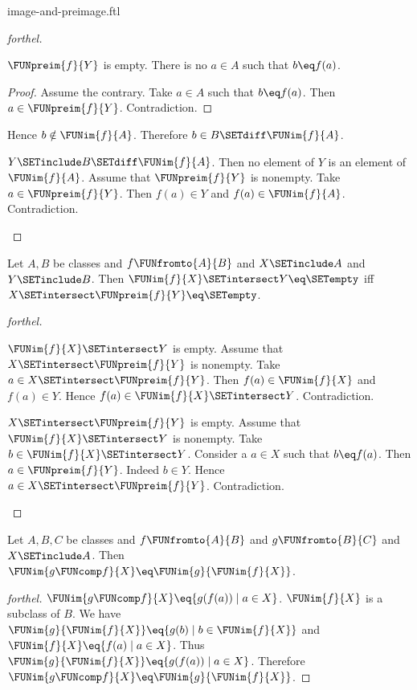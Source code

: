 \documentclass{naproche-library}
\begin{document}
\begin{smodule}[title=Computation Laws for Images and Preimages]{image-and-preimage.ftl}
\begin{proof}[forthel]
\begin{case}{$\FUNpreim{f}{Y}$ is empty.}
    There is no $a \in A$ such that $b \eq f(a)$.
    \begin{proof}
      Assume the contrary.
      Take $a \in A$ such that $b \eq f(a)$.
      Then $a \in \FUNpreim{f}{Y}$.
      Contradiction.
    \end{proof}

    Hence $b \notin \FUNim{f}{A}$.
    Therefore $b \in B \SETdiff \FUNim{f}{A}$.
  \end{case}

  \begin{case}{$Y \SETinclude B \SETdiff \FUNim{f}{A}$.}
    Then no element of $Y$ is an element of $\FUNim{f}{A}$.
    Assume that $\FUNpreim{f}{Y}$ is nonempty.
    Take $a \in \FUNpreim{f}{Y}$.
    Then $f(a) \in Y$ and $f(a) \in \FUNim{f}{A}$.
    Contradiction.
  \end{case}
\end{proof}

\begin{proposition}[forthel,id=FOUNDATIONS_07_6295504988143616]
  Let $A, B$ be classes and $f \FUNfromto{A}{B}$ and $X \SETinclude A$ and $Y \SETinclude B$.
  Then $\FUNim{f}{X} \SETintersect Y \eq \SETempty$ iff $X \SETintersect \FUNpreim{f}{Y} \eq \SETempty$.
\end{proposition}
\begin{proof}[forthel]
  \begin{case}{$\FUNim{f}{X} \SETintersect Y$ is empty.}
    Assume that $X \SETintersect \FUNpreim{f}{Y}$ is nonempty.
    Take $a \in X \SETintersect \FUNpreim{f}{Y}$.
    Then $f(a) \in \FUNim{f}{X}$ and $f(a) \in Y$.
    Hence $f(a) \in \FUNim{f}{X} \SETintersect Y$.
    Contradiction.
  \end{case}

  \begin{case}{$X \SETintersect \FUNpreim{f}{Y}$ is empty.}
    Assume that $\FUNim{f}{X} \SETintersect Y$ is nonempty.
    Take $b \in \FUNim{f}{X} \SETintersect Y$.
    Consider a $a \in X$ such that $b \eq f(a)$.
    Then $a \in \FUNpreim{f}{Y}$.
    Indeed $b \in Y$.
    Hence $a \in X \SETintersect \FUNpreim{f}{Y}$.
    Contradiction.
  \end{case}
\end{proof}

\begin{proposition}[forthel,id=FOUNDATIONS_07_5628919411638272]
  Let $A, B, C$ be classes and $f \FUNfromto{A}{B}$ and $g \FUNfromto{B}{C}$ and $X \SETinclude A$.
  Then $\FUNim{g \FUNcomp f}{X} \eq \FUNim{g}{\FUNim{f}{X}}$.
\end{proposition}
\begin{proof}[forthel]
  $\FUNim{g \FUNcomp f}{X} \eq \{ g(f(a)) \mid a \in X \}$.
  $\FUNim{f}{X}$ is a subclass of $B$.
  We have $\FUNim{g}{\FUNim{f}{X}} \eq \{ g(b) \mid b \in \FUNim{f}{X} \}$ and $\FUNim{f}{X} \eq \{ f(a) \mid a \in X \}$.
  Thus $\FUNim{g}{\FUNim{f}{X}} \eq \{ g(f(a)) \mid a \in X \}$.
  Therefore $\FUNim{g \FUNcomp f}{X} \eq \FUNim{g}{\FUNim{f}{X}}$.
\end{proof}


\end{smodule}
\end{document}
